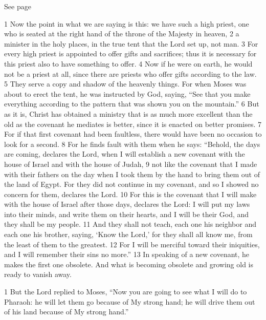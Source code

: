 \begin{bible}

See page \pageref{sec:KeyPassage}


1 Now the point in what we are saying is this: we have such a high priest, one who is seated at the right hand of the throne of the Majesty in heaven, 2 a minister in the holy places, in the true tent that the Lord set up, not man. 3 For every high priest is appointed to offer gifts and sacrifices; thus it is necessary for this priest also to have something to offer. 4 Now if he were on earth, he would not be a priest at all, since there are priests who offer gifts according to the law. 5 They serve a copy and shadow of the heavenly things. For when Moses was about to erect the tent, he was instructed by God, saying, ``See that you make everything according to the pattern that was shown you on the mountain.'' 6 But as it is, Christ has obtained a ministry that is as much more excellent than the old as the covenant he mediates is better, since it is enacted on better promises. 7 For if that first covenant had been faultless, there would have been no occasion to look for a second. 8 For he finds fault with them when he says: ``Behold, the days are coming, declares the Lord, when I will establish a new covenant with the house of Israel and with the house of Judah, 9 not like the covenant that I made with their fathers on the day when I took them by the hand to bring them out of the land of Egypt. For they did not continue in my covenant, and so I showed no concern for them, declares the Lord. 10 For this is the covenant that I will make with the house of Israel after those days, declares the Lord: I will put my laws into their minds, and write them on their hearts, and I will be their God, and they shall be my people. 11 And they shall not teach, each one his neighbor and each one his brother, saying, `Know the Lord,' for they shall all know me, from the least of them to the greatest. 12 For I will be merciful toward their iniquities, and I will remember their sins no more.'' 13 In speaking of a new covenant, he makes the first one obsolete. And what is becoming obsolete and growing old is ready to vanish away.


1 But the Lord replied to Moses, ``Now you are going to see what I will do to Pharaoh: he will let them go because of My strong hand; he will drive them out of his land because of My strong hand.''


\end{bible}
